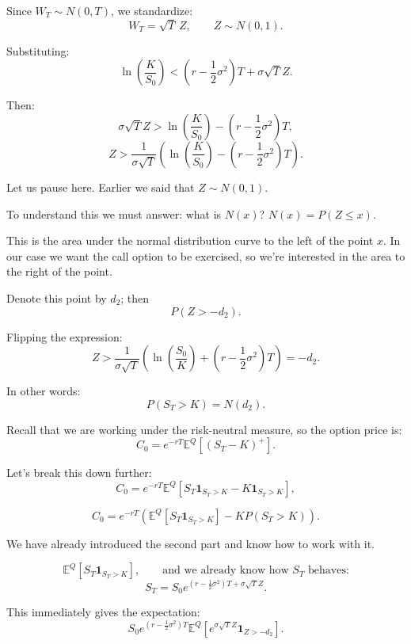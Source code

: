 \documentclass[12pt]{article}
\begin{document}
Since $W_T\sim N(0,T)$, we standardize:
\[
W_T=\sqrt{T}\,Z, \qquad Z\sim N(0,1).
\]

Substituting:
\[
\ln\left(\frac{K}{S_0}\right)
<
\left(r - \frac12\sigma^2\right)T + \sigma\sqrt{T}Z.
\]

Then:
\[
\sigma\sqrt{T}Z >
\ln\left(\frac{K}{S_0}\right)
-
\left(r - \frac12\sigma^2\right)T,
\]
\[
Z >
\frac{1}{\sigma\sqrt{T}}
\left(
\ln\left(\frac{K}{S_0}\right)
-
\left(r - \frac12\sigma^2\right)T
\right).
\]

Let us pause here. Earlier we said that $Z\sim N(0,1)$.

To understand this we must answer: what is $N(x)$? $N(x)=P(Z\le x)$.

This is the area under the normal distribution curve to the left of
the point $x$. In our case we want the call option to be exercised,
so we're interested in the area to the right of the point.

Denote this point by $d_2$; then
\[
P(Z>-d_2).
\]

Flipping the expression:
\[
Z >
\frac{1}{\sigma\sqrt{T}}
\left(
\ln\left(\frac{S_0}{K}\right)
+
\left(r - \frac12\sigma^2\right)T
\right)
= -d_2.
\]

In other words:
\begin{equation}
P(S_T>K)=N(d_2).
\end{equation}

Recall that we are working under the risk-neutral measure, so the
option price is:
\begin{equation}
C_0=e^{-rT}\mathbb{E}^Q[(S_T-K)^+].
\end{equation}

Let's break this down further:
\begin{equation}
C_0=e^{-rT}\mathbb{E}^Q[S_T\mathbf{1}_{S_T>K}-K\mathbf{1}_{S_T>K}],
\end{equation}

\begin{equation}
C_0=e^{-rT}
\left(
\mathbb{E}^Q[S_T\mathbf{1}_{S_T>K}]
-
K P(S_T>K)
\right).
\end{equation}

We have already introduced the second part and know how to work
with it.

\[
\mathbb{E}^Q[S_T\mathbf{1}_{S_T>K}],\qquad
\text{and we already know how } S_T \text{ behaves:}
\]
\[
S_T=S_0 e^{(r-\frac12\sigma^2)T+\sigma\sqrt{T}Z}.
\]

This immediately gives the expectation:
\[
S_0 e^{(r-\frac12\sigma^2)T}
\mathbb{E}^Q\left[e^{\sigma\sqrt{T}Z}\mathbf{1}_{Z>-d_2}\right].
\]
\end{document}
